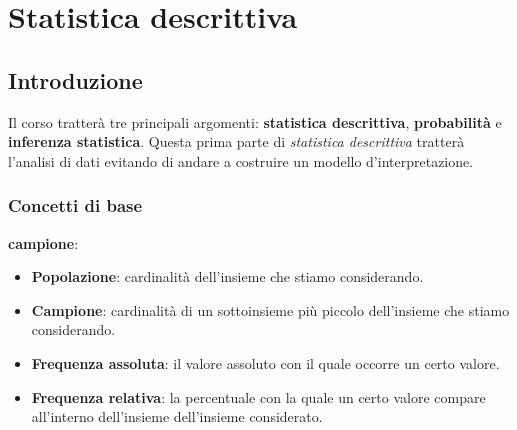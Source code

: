 \part{Statistica descrittiva}
\chapter{Introduzione}
Il corso tratterà tre principali argomenti: \textbf{statistica descrittiva}, \textbf{probabilità}
e \textbf{inferenza statistica}. Questa prima parte di \emph{statistica descrittiva} tratterà
l'analisi di dati evitando di andare a costruire un modello d'interpretazione.

\section{Concetti di base}
\textbf{campione}:
\begin{itemize}
	\item \textbf{Popolazione}: cardinalità dell'insieme che stiamo considerando.
	\item \textbf{Campione}: cardinalità di un sottoinsieme più piccolo dell'insieme che stiamo
	      considerando.
\end{itemize}

\begin{itemize}
	\item \textbf{Frequenza assoluta}: il valore assoluto con il quale occorre un certo valore.
	\item \textbf{Frequenza relativa}: la percentuale con la quale un certo valore compare
	      all'interno dell'insieme dell'insieme considerato.
\end{itemize}
